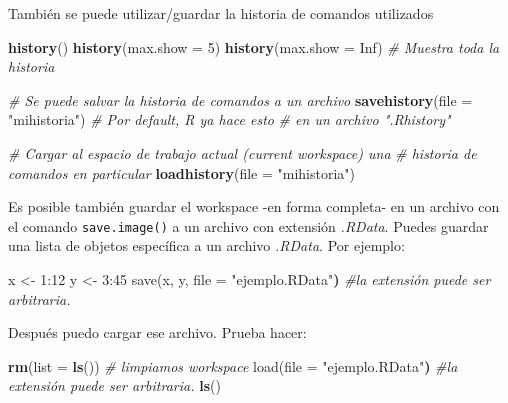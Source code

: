 \documentclass[]{article}
\newenvironment{Shaded}{\begin{snugshade}}{\end{snugshade}}
\newcommand{\KeywordTok}[1]{\textcolor[rgb]{0.13,0.29,0.53}{\textbf{{#1}}}}
\newcommand{\DataTypeTok}[1]{\textcolor[rgb]{0.13,0.29,0.53}{{#1}}}
\newcommand{\DecValTok}[1]{\textcolor[rgb]{0.00,0.00,0.81}{{#1}}}
\newcommand{\StringTok}[1]{\textcolor[rgb]{0.31,0.60,0.02}{{#1}}}
\newcommand{\CommentTok}[1]{\textcolor[rgb]{0.56,0.35,0.01}{\textit{{#1}}}}
\newcommand{\OtherTok}[1]{\textcolor[rgb]{0.56,0.35,0.01}{{#1}}}
\newcommand{\ErrorTok}[1]{\textbf{{#1}}}
\newcommand{\NormalTok}[1]{{#1}}
\begin{document}
También se puede utilizar/guardar la historia de comandos utilizados

\begin{Shaded}
\begin{Highlighting}[]
\KeywordTok{history}\NormalTok{()}
\KeywordTok{history}\NormalTok{(}\DataTypeTok{max.show =} \DecValTok{5}\NormalTok{)}
\KeywordTok{history}\NormalTok{(}\DataTypeTok{max.show =} \OtherTok{Inf}\NormalTok{) }\CommentTok{# Muestra toda la historia}

\CommentTok{# Se puede salvar la historia de comandos a un archivo}
\KeywordTok{savehistory}\NormalTok{(}\DataTypeTok{file =} \StringTok{"mihistoria"}\NormalTok{) }\CommentTok{# Por default, R ya hace esto }
\CommentTok{# en un archivo ".Rhistory"}

\CommentTok{# Cargar al espacio de trabajo actual (current workspace) una }
\CommentTok{# historia de comandos en particular}
\KeywordTok{loadhistory}\NormalTok{(}\DataTypeTok{file =} \StringTok{"mihistoria"}\NormalTok{)}
\end{Highlighting}
\end{Shaded}

Es posible también guardar el workspace -en forma completa- en un
archivo con el comando \texttt{save.image()} a un archivo con extensión
\emph{.RData}. Puedes guardar una lista de objetos específica a un
archivo \emph{.RData}. Por ejemplo:

\begin{Shaded}
\begin{Highlighting}[]
\NormalTok{x <-}\StringTok{ }\DecValTok{1}\NormalTok{:}\DecValTok{12}
\NormalTok{y <-}\StringTok{ }\DecValTok{3}\NormalTok{:}\DecValTok{45}
\NormalTok{save(x, y, file = }\StringTok{"ejemplo.RData"}\ErrorTok{)} \CommentTok{#la extensión puede ser arbitraria.}
\end{Highlighting}
\end{Shaded}

Después puedo cargar ese archivo. Prueba hacer:

\begin{Shaded}
\begin{Highlighting}[]
\KeywordTok{rm}\NormalTok{(}\DataTypeTok{list =} \KeywordTok{ls}\NormalTok{()) }\CommentTok{# limpiamos workspace}
\NormalTok{load(file = }\StringTok{"ejemplo.RData"}\ErrorTok{)} \CommentTok{#la extensión puede ser arbitraria.}
\KeywordTok{ls}\NormalTok{()}
\end{Highlighting}
\end{Shaded}
\end{document}
